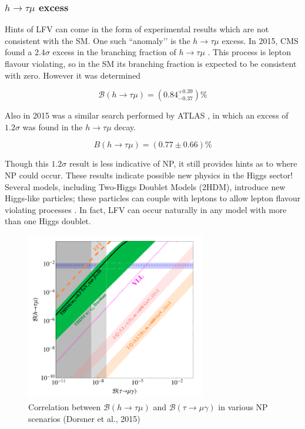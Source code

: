 \documentclass[12pt,a4paper]{article} %
\newcommand{\br}{\mathcal{B}}
\newcommand{\tmg}{\tau\to\mu\gamma}
\newcommand{\htm}{h\to \tau \mu}
\begin{document}
\subsubsection{$\htm$ excess}

Hints of LFV can come in the form of experimental results which are not consistent with the SM. One such ``anomaly’’ is the $\htm$ excess. In 2015, CMS found a $2.4\sigma$ excess in the branching fraction of $\htm$ \cite{CMS:2015a}. This process is lepton flavour violating, so in the SM its branching fraction is expected to be consistent with zero. However it was determined

\begin{equation}
\br(h\to \tau \mu) = (0.84^{+0.39}_{-0.37})\%
\end{equation}


Also in 2015 was a similar search performed by ATLAS \cite{ATLAS:2015}, in which an excess of $1.2\sigma$ was found in the $\htm$ decay. 

\begin{equation}
B(\htm) = (0.77 \pm 0.66)\%
\end{equation}

Though this $1.2\sigma$ result is less indicative of NP, it still provides hints as to where NP could occur. These results indicate possible new physics in the Higgs sector! Several models, including Two-Higgs Doublet Models (2HDM), introduce new Higgs-like particles; these particles can couple with leptons to allow lepton flavour violating processes \cite{Harnik:2012}. In fact, LFV can occur naturally in any model with more than one Higgs doublet.


\begin{figure}[h]
\centering
\includegraphics[width=0.7\textwidth]{images/h-vs-tau.png}
\caption{Correlation between $\br(\htm)$ and $\br(\tmg)$ in various NP scenarios (Dorsner et al., 2015)}
\label{}
\end{figure}
\end{document}

